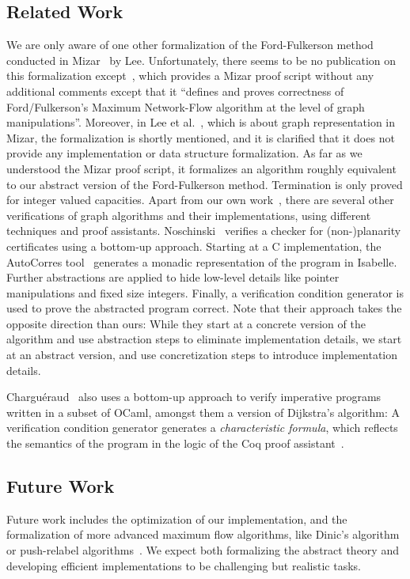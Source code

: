 \documentclass[11pt,a4paper]{article}
\begin{document}
  \subsection{Related Work}\label{sec:related_work} 
  We are only aware
  of one other formalization of the Ford-Fulkerson method conducted in
  Mizar~\cite{MaRu05} by Lee. Unfortunately, there seems to be no publication on
  this formalization except~\cite{Lee05}, which provides a Mizar proof script
  without any additional comments except that it ``defines and proves
  correctness of Ford/Fulkerson's Maximum Network-Flow algorithm at the level of
  graph manipulations''. Moreover, in Lee et al.~\cite{LeRu07}, which is about
  graph representation in Mizar, the formalization is shortly mentioned, and it
  is clarified that it does not provide any implementation or data structure
  formalization. As far as we understood the Mizar proof script, it formalizes
  an algorithm roughly equivalent to our abstract version of the Ford-Fulkerson
  method. Termination is only proved for integer valued capacities. Apart from
  our own work~\cite{La14,NoLa12}, there are several other verifications of
  graph algorithms and their implementations, using different techniques and
  proof assistants. Noschinski~\cite{Nosch15} verifies a checker for
  (non-)planarity certificates using a bottom-up approach. Starting at a C
  implementation, the AutoCorres tool~\cite{Greenaway15,GAK12} generates a
  monadic representation of the program in Isabelle. Further abstractions are
  applied to hide low-level details like pointer manipulations and fixed size
  integers. Finally, a verification condition generator is used to prove the
  abstracted program correct. Note that their approach takes the opposite
  direction than ours: While they start at a concrete version of the algorithm
  and use abstraction steps to eliminate implementation details, we start at an
  abstract version, and use concretization steps to introduce implementation
  details.

  Chargu\'eraud~\cite{char11} also uses a bottom-up approach to verify
  imperative programs written in a subset of OCaml, amongst them a version of
  Dijkstra's algorithm: A verification condition generator generates a
  \emph{characteristic formula}, which reflects the semantics of the program in
  the logic of the Coq proof assistant~\cite{BeCa10}. 

  \subsection{Future Work}
  Future work includes the optimization of our implementation, and the
  formalization of more advanced maximum flow algorithms, like Dinic's
  algorithm~\cite{Di06} or push-relabel algorithms~\cite{GoTa88}. We expect both
  formalizing the abstract theory and developing efficient implementations to be
  challenging but realistic tasks.


\end{document}
